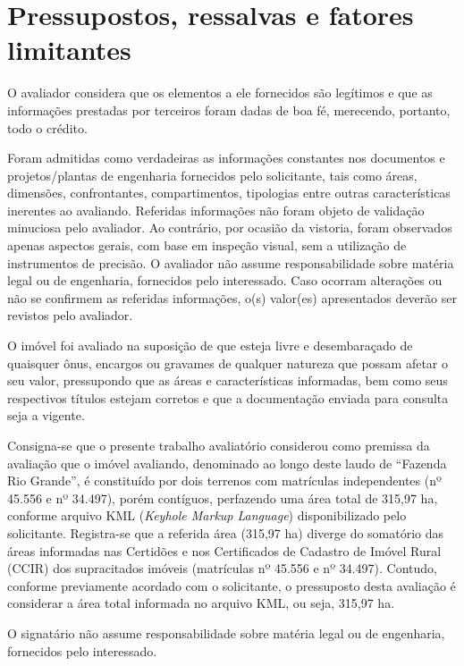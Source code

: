 \documentclass[
  10pt,
  a4paper]{article}
\begin{document}
\section{Pressupostos, ressalvas e fatores
limitantes}\label{pressupostos-ressalvas-e-fatores-limitantes}

O avaliador considera que os elementos a ele fornecidos são legítimos e
que as informações prestadas por terceiros foram dadas de boa fé,
merecendo, portanto, todo o crédito.

Foram admitidas como verdadeiras as informações constantes nos
documentos e projetos/plantas de engenharia fornecidos pelo solicitante,
tais como áreas, dimensões, confrontantes, compartimentos, tipologias
entre outras características inerentes ao avaliando. Referidas
informações não foram objeto de validação minuciosa pelo avaliador. Ao
contrário, por ocasião da vistoria, foram observados apenas aspectos
gerais, com base em inspeção visual, sem a utilização de instrumentos de
precisão. O avaliador não assume responsabilidade sobre matéria legal ou
de engenharia, fornecidos pelo interessado. Caso ocorram alterações ou
não se confirmem as referidas informações, o(s) valor(es) apresentados
deverão ser revistos pelo avaliador.

O imóvel foi avaliado na suposição de que esteja livre e desembaraçado
de quaisquer ônus, encargos ou gravames de qualquer natureza que possam
afetar o seu valor, pressupondo que as áreas e características
informadas, bem como seus respectivos títulos estejam corretos e que a
documentação enviada para consulta seja a vigente.

Consigna-se que o presente trabalho avaliatório considerou como premissa
da avaliação que o imóvel avaliando, denominado ao longo deste laudo de
``Fazenda Rio Grande'', é constituído por dois terrenos com matrículas
independentes (nº 45.556 e nº 34.497), porém contíguos, perfazendo uma
área total de 315,97 ha, conforme arquivo KML (\emph{Keyhole Markup
Language}) disponibilizado pelo solicitante. Registra-se que a referida
área (315,97 ha) diverge do somatório das áreas informadas nas Certidões
e nos Certificados de Cadastro de Imóvel Rural (CCIR) dos supracitados
imóveis (matrículas nº 45.556 e nº 34.497). Contudo, conforme
previamente acordado com o solicitante, o pressuposto desta avaliação é
considerar a área total informada no arquivo KML, ou seja, 315,97 ha.

O signatário não assume responsabilidade sobre matéria legal ou de
engenharia, fornecidos pelo interessado.
\end{document}
